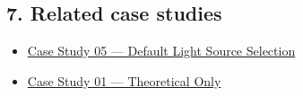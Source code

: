 \documentclass[
  11pt,
]{article}
\providecommand{\tightlist}{
  \setlength{\itemsep}{0pt}\setlength{\parskip}{0pt}}
\begin{document}
\hypertarget{7-related-case-studies}{
\subsection{7. Related case studies}\label{7-related-case-studies}}

\begin{itemize}
\tightlist
\item
  \href{https://github.com/pinarsyt/overlap-calculator/blob/main/case_studies/05_default_light_source_selection/README.md}{Case
  Study 05 --- Default Light Source Selection}
\item
  \href{https://github.com/pinarsyt/overlap-calculator/blob/main/case_studies/01_theoretical_only/README.md}{Case
  Study 01 --- Theoretical Only}
\end{itemize}
\end{document}
